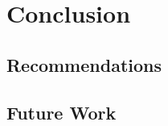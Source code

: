 \section{Conclusion}\label{sect:conclusion}
\blindtext[1]

\subsection{Recommendations}\label{subsect:recommendations}
\blindtext[1]

\subsection{Future Work}
\blindtext[1]
